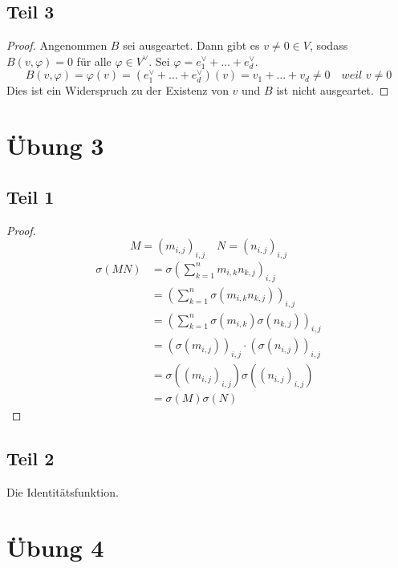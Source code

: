 \documentclass[10pt,a4paper]{article}
\begin{document}
\subsection*{Teil 3}

\begin{proof}
Angenommen $B$ sei ausgeartet.
Dann gibt es $v \ne 0 \in V$, sodass $B(v, \varphi) = 0$ für alle $\varphi \in V^{\vee}$.
Sei $\varphi = e_{1}^{\vee} + \dots + e_{d}^{\vee}$.
\begin{equation}
B(v, \varphi) = \varphi(v) = (e_{1}^{\vee} + \dots + e_{d}^{\vee})(v) = v_{1} + \dots + v_{d} \ne 0 \quad \textit{weil $v \ne 0$}
\end{equation}
Dies ist ein Widerspruch zu der Existenz von $v$ und $B$ ist nicht ausgeartet.
\end{proof}

\section*{Übung 3}

\subsection*{Teil 1}

\begin{proof}
\begin{equation}
M = (m_{i,j})_{i,j} \quad N = (n_{i,j})_{i,j}
\end{equation}
\begin{align*}
\sigma(MN) & = \sigma\left( \sum_{k = 1}^{n} m_{i,k}n_{k,j} \right)_{i,j}\\
& = \left( \sum_{k = 1}^{n} \sigma(m_{i,k}n_{k,j}) \right)_{i,j}\\
& = \left( \sum_{k = 1}^{n} \sigma(m_{i,k})\sigma(n_{k,j}) \right)_{i,j}\\
& = (\sigma(m_{i,j}))_{i,j} \cdot (\sigma(n_{i,j}))_{i,j}\\
& = \sigma((m_{i,j})_{i,j})\sigma((n_{i,j})_{i,j})\\
& = \sigma(M)\sigma(N)
\end{align*}
\end{proof}

\subsection*{Teil 2}

Die Identitätsfunktion.

\section*{Übung 4}
\end{document}
